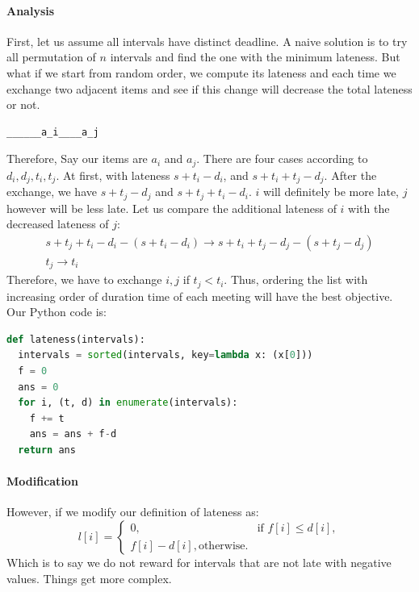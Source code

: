 \documentclass[../main.tex]{subfiles}
\begin{document}
\paragraph{Analysis} First, let us assume all intervals have distinct deadline. A naive solution is to try all permutation of $n$ intervals and find the one with the minimum lateness. But what if we start from random order, we compute its lateness and each time we exchange two adjacent items and see if this change will decrease the total lateness or not. 
\begin{lstlisting}
______a_i____a_j
\end{lstlisting}
Therefore, 
Say our items are $a_i$ and $a_{j}$. There are four cases according to $d_i, d_{j}, t_i, t_{j}$. At first, with lateness $s + t_i -d_i$, and $s+t_i+t_j-d_j$. After the exchange, we have $s+t_j - d_j$ and $s+t_j+t_i - d_i$. $i$ will definitely be more late, $j$ however will be less late. Let us compare the additional lateness of $i$ with the decreased lateness of $j$:
    \begin{align}
        s+t_j+t_i - d_i - (s+t_i-d_i) \xrightarrow{} s+t_i+t_j-d_j - (s+t_j-d_j) \\
        t_j \xrightarrow{} t_i
    \end{align}
Therefore, we have to exchange $i,j$ if $t_j < t_i$. Thus, ordering the list with increasing order of duration time of each meeting will have the best objective. Our Python code is:
\begin{lstlisting}[language=Python]
def lateness(intervals):
  intervals = sorted(intervals, key=lambda x: (x[0]))
  f = 0
  ans = 0
  for i, (t, d) in enumerate(intervals):
    f += t
    ans = ans + f-d 
  return ans
\end{lstlisting}
\paragraph{Modification} However, if we modify our definition of lateness as:
\begin{equation}
    l[i] = \begin{cases} 0, & \text{if } f[i] \leq d[i], \\
    f[i] - d[i], \text{otherwise}.
    \end{cases}
\end{equation}
Which is to say we do not reward for intervals that are not late with negative values. Things get more complex. 
\end{document}
